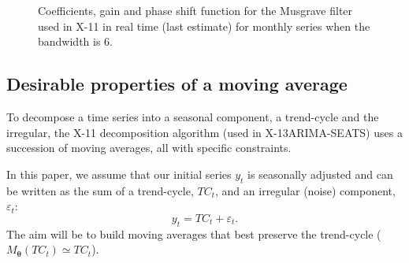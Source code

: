 \documentclass[
]{article}
\newcommand\1{\mathds{1}}
\begin{document}
\begin{figure}

\caption{\label{fig-graphsmusgrave}Coefficients, gain and phase shift
function for the Musgrave filter used in X-11 in real time (last
estimate) for monthly series when the bandwidth is 6.}


\end{figure}%

\subsection{Desirable properties of a moving
average}\label{desirable-properties-of-a-moving-average}

To decompose a time series into a seasonal component, a trend-cycle and
the irregular, the X-11 decomposition algorithm (used in
X-13ARIMA-SEATS) uses a succession of moving averages, all with specific
constraints.

In this paper, we assume that our initial series \(y_t\) is seasonally
adjusted and can be written as the sum of a trend-cycle, \(TC_t\), and
an irregular (noise) component, \(\varepsilon_t\): \[
y_t=TC_t+\varepsilon_t.
\] The aim will be to build moving averages that best preserve the
trend-cycle (\(M_{\boldsymbol\theta} (TC_t)\simeq TC_t\)).
\end{document}
